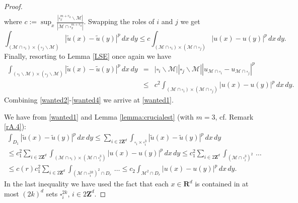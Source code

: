 \documentclass[11pt]{article}
\newcommand{\ext}[1]{\widetilde{#1}}
\newcommand{\R}{\mathbf{R}}
\def\M{\mathcal{M}}
\newcommand\Z{\mathbf{Z}}
\theoremstyle{remark}
\begin{document}
\begin{appendices}
\begin{proof}
\begin{eqnarray}
	\end{eqnarray} 
where	$c:=\sup_x\frac{|\square_x^{m+r_0} \backslash \M|}{|\M \cap \square_x^{m+r_0}|}$.	
Swapping the roles of $i$ and $j$ we get
	\begin{equation}
		\int_{(\M \cap \square_i)\times (\square_j \backslash \M) } |\ext u(x)-\ext u(y)|^p \,dx\,dy \leq    c 	\int_{(\M \cap \square_i) \times (\M \cap \square_j)} |u(x)-u(y)|^p \,dx\,dy.
	\end{equation} 	
	Finally, resorting to Lemma \ref{LSE} once again  we have
	\begin{eqnarray} \nonumber
		\int_{(\square_i \backslash \M)\times ( \square_j\backslash \M) } |\ext u(x)-\ext u(y)|^p \,dx\,dy & = &|\square_i \backslash \M||\square_j \backslash \M| |u_{\M \cap \square_i}-u_{\M \cap \square_j} |^p \\ &\leq& \label{wanted4}  c^2 	\int_{(\M \cap \square_i) \times (\M \cap \square_j)} |u(x)-u(y)|^p \,dx\,dy.
	\end{eqnarray} 	
	Combining \eqref{wanted2}-\eqref{wanted4} we arrive at \eqref{wanted1}.
	

	We have from \eqref{wanted1} and Lemma \ref{lemma:crucialest} (with $m=3$, cf. Remark \ref{rA.4}):
	\begin{multline*}
		\int_{  D_{1}} |\ext u(x)-\ext u(y)|^p\,dx\, dy\leq \sum_{i \in 2\Z^d} \int_{\square_i \times \square_i^3} |\ext u(x)-\ext u(y)|^p\,dx\, dy 
		\\   
		\leq  c_1^2		\sum_{i \in 2\Z^d} \int_{(\M \cap \square_i) \times (\M \cap \square_i^3 )}|u(x)-u(y)|^p\,dx\, dy 
		 \leq   	c_1^2		\sum_{i \in 2\Z^d} \int_{(\M \cap \square_i^3)^2} \,\dots
		 \\
		 \leq   c(r) c_1^2\sum_{i \in 2\Z^d}\int_{(\M\cap \square_i^{2k})^2 \cap D_r} \,\dots 
		 \leq  c_2\int_{\M^2 \cap D_r} |u(x)-u(y)|^p\,dx\,dy.
	\end{multline*}
	In the last inequality we have used the fact that each $x \in \R^d$ is contained in at most $(2k)^d$ sets $\square_i^{2k}$, $i \in 2\Z^d$.
\end{proof}




\end{appendices}
\end{document}
